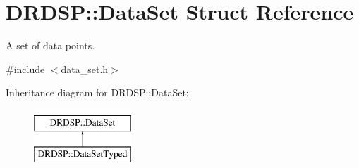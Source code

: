 \hypertarget{struct_d_r_d_s_p_1_1_data_set}{\section{D\-R\-D\-S\-P\-:\-:Data\-Set Struct Reference}
\label{struct_d_r_d_s_p_1_1_data_set}
}


A set of data points.  




{\ttfamily \#include $<$data\-\_\-set.\-h$>$}

Inheritance diagram for D\-R\-D\-S\-P\-:\-:Data\-Set\-:\begin{figure}[H]
\begin{center}
\leavevmode
\includegraphics[height=2.000000cm]{struct_d_r_d_s_p_1_1_data_set}
\end{center}
\end{figure}
